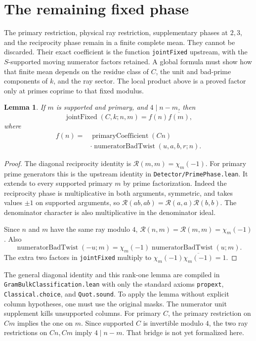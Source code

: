 \documentclass{article}
\newtheorem{lemma}{Lemma}
\begin{document}
\section*{The remaining fixed phase}

The primary restriction, physical ray restriction, supplementary phases at
$2,3$, and the reciprocity phase remain in a finite complete mean.
They cannot be discarded.
Their exact coefficient is the function \texttt{jointFixed} upstream,
with the $S$-supported moving numerator factors retained.
A global formula must show how that finite mean depends on the residue class
of $C$, the unit and bad-prime components of $k$, and the ray sector.
The local product above is a proved factor only at primes coprime to that
fixed modulus.

\begin{lemma}
If $m$ is supported and primary, and $4\mid n-m$, then
\[
 \operatorname{jointFixed}(C,k;n,m)=f(n)\overline{f(m)},
\]
where
\[
 \begin{split}
 f(n)={}&\operatorname{primaryCoefficient}(Cn)\\
 &\cdot\operatorname{numeratorBadTwist}(u,a,b,r;n).
 \end{split}
\]
\end{lemma}

\begin{proof}
The diagonal reciprocity identity is $\mathcal R(m,m)=\chi_m(-1)$.
For primary prime generators this is the upstream identity in
\texttt{Detector/PrimePhase.lean}.
It extends to every supported primary $m$ by prime factorization.
Indeed the reciprocity phase is multiplicative in both arguments, symmetric,
and takes values $\pm1$ on supported arguments, so
$\mathcal R(ab,ab)=\mathcal R(a,a)\mathcal R(b,b)$.
The denominator character is also multiplicative in the denominator ideal.

Since $n$ and $m$ have the same ray modulo $4$,
$\mathcal R(n,m)=\mathcal R(m,m)=\chi_m(-1)$.
Also
\[
 \operatorname{numeratorBadTwist}(-u;m)
 =\chi_m(-1)\operatorname{numeratorBadTwist}(u;m).
\]
The extra two factors in \texttt{jointFixed} multiply to
$\chi_m(-1)\overline{\chi_m(-1)}=1$.
\end{proof}

The general diagonal identity and this rank-one lemma are compiled in
\texttt{GramBulkClassification.lean} with only the standard axioms
\texttt{propext}, \texttt{Classical.choice}, and \texttt{Quot.sound}.
To apply the lemma without explicit column hypotheses, one must use the
original masks.
The numerator unit supplement kills unsupported columns.
For primary $C$, the primary restriction on $Cm$ implies the one on $m$.
Since supported $C$ is invertible modulo $4$, the two ray restrictions on
$Cn,Cm$ imply $4\mid n-m$.
That bridge is not yet formalized here.
\end{document}
